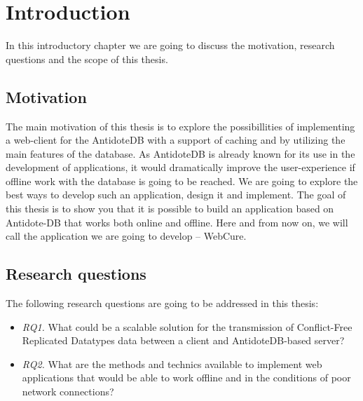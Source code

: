 \chapter{Introduction}
\label{Introduction}

In this introductory chapter we are going to discuss the motivation, research questions and the scope of this thesis.

\section{Motivation}
\label{Introduction-Motivation}

The main motivation of this thesis is to explore the possibillities of implementing a web-client for the AntidoteDB with a support of caching and by utilizing the main features of the database. As AntidoteDB is already known for its use in the development of applications, it would dramatically improve the user-experience if offline work with the database is going to be reached. We are going to explore the best ways to develop such an application, design it and implement. The goal of this thesis is to show you that it is possible to build an application based on Antidote-DB that works both online and offline. Here and from now on, we will call the application we are going to develop -- WebCure.


\section{Research questions}
\label{Introduction-Research}

The following research questions are going to be addressed in this thesis:

\begin{itemize}
    \item \textit{RQ1.} What could be a scalable solution for the transmission of Conflict-Free Replicated Datatypes data between a client and AntidoteDB-based server?
    \item \textit{RQ2.} What are the methods and technics available to implement web applications that would be able to work offline and
    in the conditions of poor network connections?
  \end{itemize}

